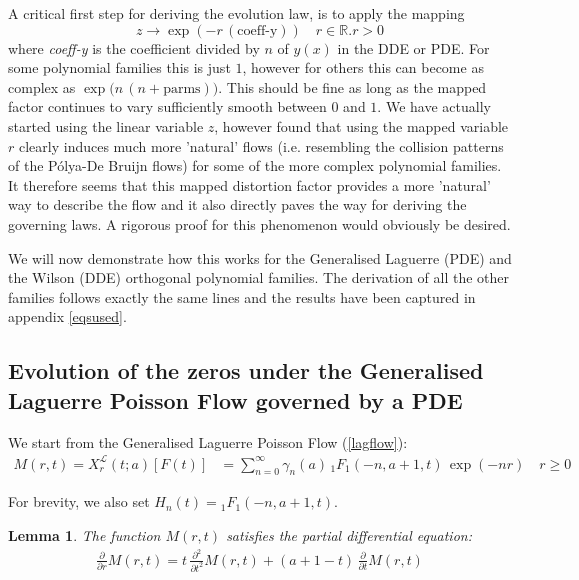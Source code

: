 \documentclass[a4paper,11pt,twoside]{amsart}
\newtheorem{lemma}[theorem]{Lemma}
\newcommand{\verifiedeq}{=}
\newcommand{\defeq}{=}
\newcommand{\verifiedeq}{\stackrel{\checkmark}{=}}
\newcommand{\defeq}{\stackrel{\scriptscriptstyle \textnormal{def}}{=}}
\begin{document}
A critical first step for deriving the evolution law, is to apply the mapping $$z \rightarrow \exp\left(-r\,(\text{coeff-y})\right) \quad r \in \mathbb{R}. r > 0$$ where \textit{coeff-y} is the coefficient divided by $n$ of $y(x)$ in the DDE or PDE. For some polynomial families this is just $1$, however for others this can become as complex as $\exp\big(n\,(n+\text{parms})\big)$. This should be fine as long as the mapped factor continues to vary sufficiently smooth between $0$ and $1$. We have actually started using the linear variable $z$, however found that using the mapped variable $r$ clearly induces much more 'natural' flows (i.e. resembling the collision patterns of the Pólya-De Bruijn flows) for some of the more complex polynomial families. It therefore seems that this mapped distortion factor provides a more 'natural' way to describe the flow and it also directly paves the way for deriving the governing laws. A rigorous proof for this phenomenon would obviously be desired.    

We will now demonstrate how this works for the Generalised Laguerre (PDE) and the Wilson (DDE) orthogonal polynomial families. The derivation of all the other families follows exactly the same lines and the results have been captured in appendix \ref{eqsused}.

\subsection{Evolution of the zeros under the Generalised Laguerre Poisson Flow governed by a PDE} \label{Laguerrelawspoissonflow}
We start from the Generalised Laguerre Poisson Flow (\ref{lagflow}):
\begin{align}
  M(r,t)=  X^{\mathcal{L}}_r(t;a)\left[F(t)\right] &\verifiedeq \sum_{n=0}^\infty \gamma_n(a)\,{}_1F_1\left(-n, a+1,t\right)\,\exp(-nr)\quad r \ge 0
\end{align} 

For brevity, we also set $H_n(t) \defeq {}_1F_1\left(-n, a+1,t\right)$. 

\begin{lemma}\label{proofBes1} The function $M(r,t)$ satisfies the partial differential equation: 
\begin{align}
 \frac{\partial}{\partial r}M(r,t) \verifiedeq t\,\frac{\partial^2}{\partial t^2}M(r,t) + (a+1-t)\,\frac{\partial }{\partial t}M(r,t)
\end{align}
\end{lemma}
\end{document}
